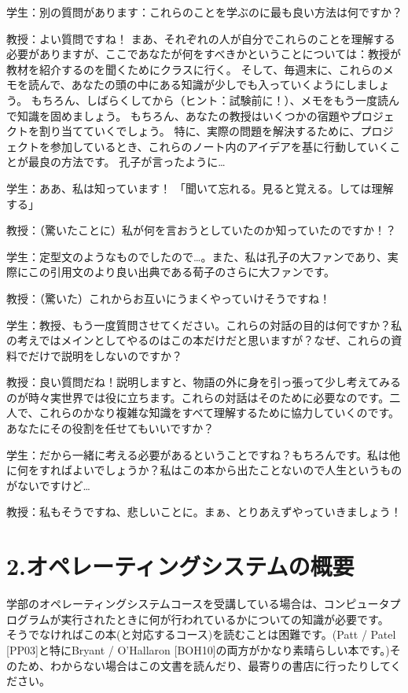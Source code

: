 学生：別の質問があります：これらのことを学ぶのに最も良い方法は何ですか？

教授：よい質問ですね！
まあ、それぞれの人が自分でこれらのことを理解する必要がありますが、ここであなたが何をすべきかということについては：教授が教材を紹介するのを聞くためにクラスに行く。
そして、毎週末に、これらのメモを読んで、あなたの頭の中にある知識が少しでも入っていくようにしましょう。
もちろん、しばらくしてから（ヒント：試験前に！）、メモをもう一度読んで知識を固めましょう。
もちろん、あなたの教授はいくつかの宿題やプロジェクトを割り当てていくでしょう。
特に、実際の問題を解決するために、プロジェクトを参加しているとき、これらのノート内のアイデアを基に行動していくことが最良の方法です。
孔子が言ったように\ldots{}

学生：ああ、私は知っています！
「聞いて忘れる。見ると覚える。しては理解する」

教授：（驚いたことに）私が何を言おうとしていたのか知っていたのですか！？

学生：定型文のようなものでしたので\ldots。また、私は孔子の大ファンであり、実際にこの引用文のより良い出典である荀子のさらに大ファンです。

教授：（驚いた）これからお互いにうまくやっていけそうですね！

学生：教授、もう一度質問させてください。これらの対話の目的は何ですか？私の考えではメインとしてやるのはこの本だけだと思いますが？なぜ、これらの資料でだけで説明をしないのですか？

教授：良い質問だね！説明しますと、物語の外に身を引っ張って少し考えてみるのが時々実世界では役に立ちます。これらの対話はそのために必要なのです。二人で、これらのかなり複雑な知識をすべて理解するために協力していくのです。あなたにその役割を任せてもいいですか？

学生：だから一緒に考える必要があるということですね？もちろんです。私は他に何をすればよいでしょうか？私はこの本から出たことないので人生というものがないですけど\ldots{}

教授：私もそうですね、悲しいことに。まぁ、とりあえずやっていきましょう！

\hypertarget{ux30aaux30daux30ecux30fcux30c6ux30a3ux30f3ux30b0ux30b7ux30b9ux30c6ux30e0ux306eux6982ux8981}{%
\section*{2.オペレーティングシステムの概要}\label{ux30aaux30daux30ecux30fcux30c6ux30a3ux30f3ux30b0ux30b7ux30b9ux30c6ux30e0ux306eux6982ux8981}}

学部のオペレーティングシステムコースを受講している場合は、コンピュータプログラムが実行されたときに何が行われているかについての知識が必要です。
そうでなければこの本(と対応するコース)を読むことは困難です。(Patt /
Patel {[}PP03{]}と特にBryant / O'Hallaron
{[}BOH10{]}の両方がかなり素晴らしい本です。)そのため、わからない場合はこの文書を読んだり、最寄りの書店に行ったりしてください。

